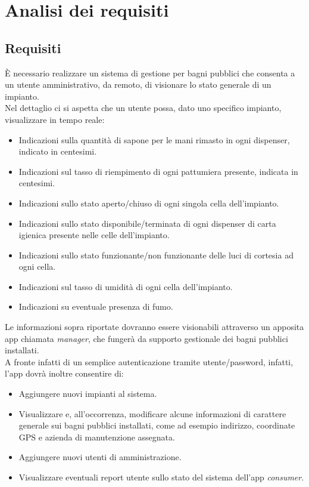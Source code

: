 \documentclass[12pt]{article}
\begin{document}
\newpage



\section{Analisi dei requisiti}
\subsection{Requisiti}

È necessario realizzare un sistema di gestione per bagni pubblici che consenta a un utente amministrativo, da remoto, di visionare lo stato generale di un impianto.\\
Nel dettaglio ci si aspetta che un utente possa, dato uno specifico impianto, visualizzare in tempo reale:
\begin{itemize}
\item Indicazioni sulla quantità di sapone per le mani rimasto in ogni dispenser, indicato in centesimi.
\item Indicazioni sul tasso di riempimento di ogni pattumiera presente, indicata in centesimi.
\item Indicazioni sullo stato aperto/chiuso di ogni singola cella dell'impianto.
\item Indicazioni sullo stato disponibile/terminata di ogni dispenser di carta igienica presente nelle celle dell'impianto.
\item Indicazioni sullo stato funzionante/non funzionante delle luci di cortesia ad ogni cella.
\item Indicazioni sul tasso di umidità di ogni cella dell'impianto.
\item Indicazioni su eventuale presenza di fumo.
\end{itemize}
Le informazioni sopra riportate dovranno essere visionabili attraverso un apposita app chiamata \textit{manager}, che fungerà da supporto gestionale dei bagni pubblici installati.\\
A fronte infatti di un semplice autenticazione tramite utente/password, infatti, l'app dovrà inoltre consentire di: 
\begin{itemize}
\item Aggiungere nuovi impianti al sistema.
\item Visualizzare e, all'occorrenza, modificare alcune informazioni di carattere generale sui bagni pubblici installati, come ad esempio indirizzo, coordinate GPS e azienda di manutenzione assegnata.
\item Aggiungere nuovi utenti di amministrazione.
\item Visualizzare eventuali report utente sullo stato del sistema dell'app \textit{consumer}.
\end{itemize}
\end{document}
